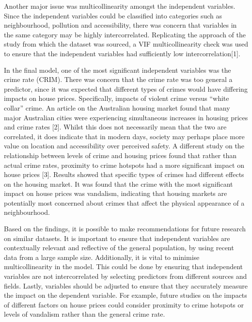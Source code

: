\documentclass[letterpaper,10pt,twocolumn,twoside,]{pinp}
\begin{document}
Another major issue was multicollinearity amongst the independent
variables. Since the independent variables could be classified into
categories such as neighbourhood, pollution and accessibility, there was
concern that variables in the same category may be highly
intercorrelated. Replicating the approach of the study from which the
dataset was sourced, a VIF multicollinearity check was used to ensure
that the independent variables had sufficiently low
intercorrelation{[}1{]}.

In the final model, one of the most significant independent variables
was the crime rate (CRIM). There was concern that the crime rate was too
general a predictor, since it was expected that different types of
crimes would have differing impacts on house prices. Specifically,
impacts of violent crime versus ``white collar'' crime. An article on
the Australian housing market found that many major Australian cities
were experiencing simultaneous increases in housing prices and crime
rates {[}2{]}. Whilst this does not necessarily mean that the two are
correlated, it does indicate that in modern days, society may perhaps
place more value on location and accessibility over perceived safety. A
different study on the relationship between levels of crime and housing
prices found that rather than actual crime rates, proximity to crime
hotspots had a more significant impact on house prices {[}3{]}. Results
showed that specific types of crimes had different effects on the
housing market. It was found that the crime with the most significant
impact on house prices was vandalism, indicating that housing markets
are potentially most concerned about crimes that affect the physical
appearance of a neighbourhood.

Based on the findings, it is possible to make recommendations for future
research on similar datasets. It is important to ensure that independent
variables are contextually relevant and reflective of the general
population, by using recent data from a large sample size. Additionally,
it is vital to minimise multicollinearity in the model. This could be
done by ensuring that independent variables are not intercorrelated by
selecting predictors from different sources and fields. Lastly,
variables should be adjusted to ensure that they accurately measure the
impact on the dependent variable. For example, future studies on the
impacts of different factors on house prices could consider proximity to
crime hotspots or levels of vandalism rather than the general crime
rate.
\end{document}
